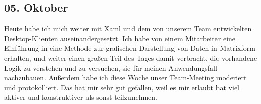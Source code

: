 \subsection{05. Oktober}
Heute habe ich mich weiter mit Xaml und dem von unserem Team entwickelten Desktop-Klienten auseinandergesetzt. Ich habe von einem Mitarbeiter eine Einführung in eine Methode zur grafischen Darstellung von Daten in Matrixform erhalten, und weiter einen großen Teil des Tages damit verbracht, die vorhandene Logik zu verstehen und zu versuchen, sie für meinen Anwendungsfall nachzubauen. Außerdem habe ich diese Woche unser Team-Meeting moderiert und protokolliert. Das hat mir sehr gut gefallen, weil es mir erlaubt hat viel aktiver und konstruktiver als sonst teilzunehmen.